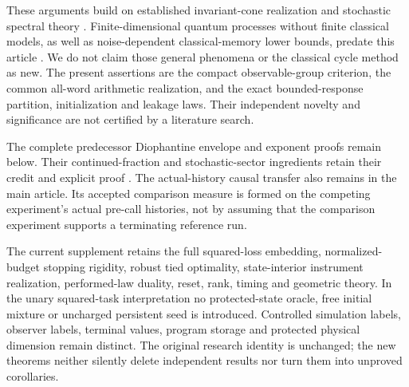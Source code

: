 These arguments build on established invariant-cone realization and stochastic spectral theory \cite{Heller65,MonrasWinter14,ThonJaeger15,Nussbaum98,BenvenutiFarina04}. Finite-dimensional quantum processes without finite classical models, as well as noise-dependent classical-memory lower bounds, predate this article \cite{Fanizza24}. We do not claim those general phenomena or the classical cycle method as new. The present assertions are the compact observable-group criterion, the common all-word arithmetic realization, and the exact bounded-response partition, initialization and leakage laws. Their independent novelty and significance are not certified by a literature search.

The complete predecessor Diophantine envelope and exponent proofs remain below. Their continued-fraction and stochastic-sector ingredients retain their credit and explicit proof \cite{DmitrievDynkin46,JohnsonPaparella17,KirklandSmigoc22,HoneVarona19}. The actual-history causal transfer also remains in the main article. Its accepted comparison measure is formed on the competing experiment's actual pre-call histories, not by assuming that the comparison experiment supports a terminating reference run.

The current supplement retains the full squared-loss embedding, normalized-budget stopping rigidity, robust tied optimality, state-interior instrument realization, performed-law duality, reset, rank, timing and geometric theory. In the unary squared-task interpretation no protected-state oracle, free initial mixture or uncharged persistent seed is introduced. Controlled simulation labels, observer labels, terminal values, program storage and protected physical dimension remain distinct. The original research identity is unchanged; the new theorems neither silently delete independent results nor turn them into unproved corollaries.
